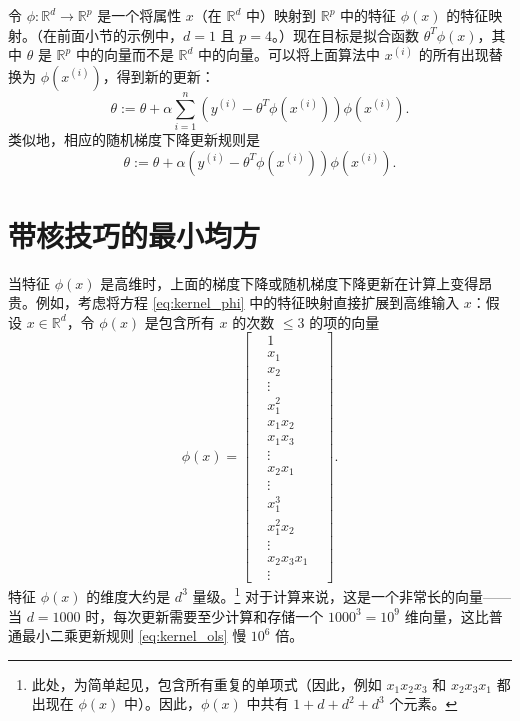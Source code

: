 令 $\phi: \mathbb{R}^d \to \mathbb{R}^p$ 是一个将属性 $x$（在 $\mathbb{R}^d$ 中）映射到 $\mathbb{R}^p$ 中的特征 $\phi(x)$ 的特征映射。（在前面小节的示例中，$d=1$ 且 $p=4$。）现在目标是拟合函数 $\theta^T \phi(x)$，其中 $\theta$ 是 $\mathbb{R}^p$ 中的向量而不是 $\mathbb{R}^d$ 中的向量。可以将上面算法中 $x^{(i)}$ 的所有出现替换为 $\phi(x^{(i)})$，得到新的更新：
\begin{equation}
    \theta := \theta + \alpha \sum_{i=1}^n (y^{(i)} - \theta^T \phi(x^{(i)})) \phi(x^{(i)}).
    \label{eq:kernel_iterate}
\end{equation}
类似地，相应的随机梯度下降更新规则是
\begin{equation}
    \theta := \theta + \alpha (y^{(i)} - \theta^T \phi(x^{(i)})) \phi(x^{(i)}).
\end{equation}

\section{带核技巧的最小均方}

当特征 $\phi(x)$ 是高维时，上面的梯度下降或随机梯度下降更新在计算上变得昂贵。例如，考虑将方程 \eqref{eq:kernel_phi} 中的特征映射直接扩展到高维输入 $x$：假设 $x \in \mathbb{R}^d$，令 $\phi(x)$ 是包含所有 $x$ 的次数 $\le 3$ 的项的向量
\begin{equation}
    \phi(x) = \begin{bmatrix} &1& \\ &x_1& \\ &x_2& \\ &\vdots& \\ &x_1^2& \\ &x_1 x_2& \\ &x_1 x_3& \\ &\vdots& \\ &x_2 x_1& \\ &\vdots& \\ &x_1^3& \\ &x_1^2 x_2& \\ &\vdots& \\ &x_2 x_3 x_1& \\ &\vdots& \end{bmatrix}. \label{eq:5.5}
\end{equation}
特征 $\phi(x)$ 的维度大约是 $d^3$ 量级。\footnote{此处，为简单起见，包含所有重复的单项式（因此，例如 $x_1 x_2 x_3$ 和 $x_2 x_3 x_1$ 都出现在 $\phi(x)$ 中）。因此，$\phi(x)$ 中共有 $1 + d + d^2 + d^3$ 个元素。} 对于计算来说，这是一个非常长的向量——当 $d = 1000$ 时，每次更新需要至少计算和存储一个 $1000^3 = 10^9$ 维向量，这比普通最小二乘更新规则 \eqref{eq:kernel_ols} 慢 $10^6$ 倍。

